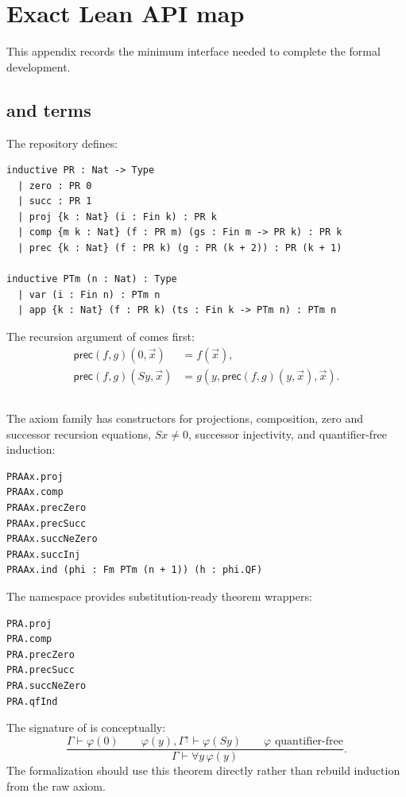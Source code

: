 \section{Exact Lean API map}

This appendix records the minimum interface needed to complete the formal
development.

\subsection{ and terms}

The repository defines:
\begin{lstlisting}[language={}]
inductive PR : Nat -> Type
  | zero : PR 0
  | succ : PR 1
  | proj {k : Nat} (i : Fin k) : PR k
  | comp {m k : Nat} (f : PR m) (gs : Fin m -> PR k) : PR k
  | prec {k : Nat} (f : PR k) (g : PR (k + 2)) : PR (k + 1)

inductive PTm (n : Nat) : Type
  | var (i : Fin n) : PTm n
  | app {k : Nat} (f : PR k) (ts : Fin k -> PTm n) : PTm n
\end{lstlisting}
The recursion argument of  comes first:
\[
\begin{aligned}
 \mathsf{prec}(f,g)(0,\vec x)&=f(\vec x),\\
 \mathsf{prec}(f,g)(S y,\vec x)
   &=g(y,\mathsf{prec}(f,g)(y,\vec x),\vec x).
\end{aligned}
\]

\subsection{\PRAAx}

The axiom family has constructors for projections, composition, zero and
successor recursion equations, \(Sx\ne0\), successor injectivity, and
quantifier-free induction:
\begin{lstlisting}[language={}]
PRAAx.proj
PRAAx.comp
PRAAx.precZero
PRAAx.precSucc
PRAAx.succNeZero
PRAAx.succInj
PRAAx.ind (phi : Fm PTm (n + 1)) (h : phi.QF)
\end{lstlisting}
The namespace  provides substitution-ready theorem wrappers:
\begin{lstlisting}[language={}]
PRA.proj
PRA.comp
PRA.precZero
PRA.precSucc
PRA.succNeZero
PRA.qfInd
\end{lstlisting}

The signature of  is conceptually:
\[
\frac{
 \Gamma\vdash\varphi(0)
 \qquad
 \varphi(y),\Gamma^\uparrow\vdash\varphi(Sy)
 \qquad \varphi\text{ quantifier-free}
}{
 \Gamma\vdash\forall y\,\varphi(y)
}.
\]
The formalization should use this theorem directly rather than rebuild
induction from the raw axiom.

